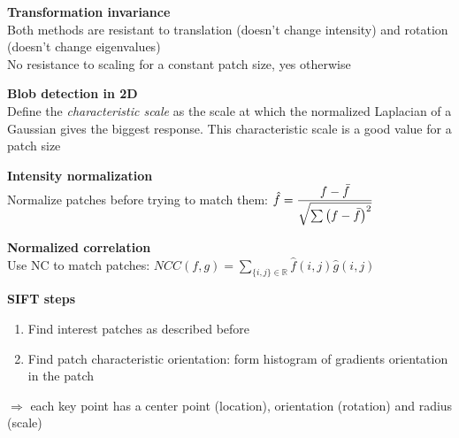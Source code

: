 \documentclass[10pt,letterpaper,landscape]{report}
\newcommand{\boxheight}{21.59cm}
\newcommand{\boxwidth}{8.85cm}
\begin{document}
\begin{small}
{\begin{minipage}[t][\boxheight][c]{\boxwidth}
    \textbf{Transformation invariance}\\
    Both methods are resistant to translation (doesn't change intensity) and rotation (doesn't change eigenvalues)\\
    No resistance to scaling for a constant patch size, yes otherwise
    
    \textbf{Blob detection in 2D}\\
    Define the \textit{characteristic scale} as the scale at which the normalized Laplacian of a Gaussian gives the biggest response. This characteristic scale is a good value for a patch size
    
    \textbf{Intensity normalization}\\
    Normalize patches before trying to match them: $\hat{f} = \dfrac{f - \Bar{f}}{\sqrt{\sum \left(f - \Bar{f}\right)^2}}$
    
    \textbf{Normalized correlation}\\
    Use NC to  match patches: $NCC(f,g) = \sum_{\{i,j\}\in\mathbb{R}} \hat{f}(i,j)\hat{g}(i,j)$
    
    \textbf{SIFT steps}
    \begin{enumerate}
        \item Find interest patches as described before
        \item Find patch characteristic orientation: form histogram of gradients orientation in the patch
    \end{enumerate}
    $\Rightarrow$ each key point has a center point (location), orientation (rotation) and radius (scale)
    
\end{minipage}
}\fbox{
\begin{minipage}[t][\boxheight][c]{\boxwidth}


	TODO



\end{minipage}
}

\fbox{
\begin{minipage}[t][\boxheight][c]{\boxwidth}

    TODO
    
\end{minipage}
}\fbox{
\begin{minipage}[t][\boxheight][c]{\boxwidth}

    TODO
    
\end{minipage}
}\fbox{
\begin{minipage}[t][\boxheight][c]{\boxwidth}


	TODO



\end{minipage}
}
\end{small}
\end{document}
